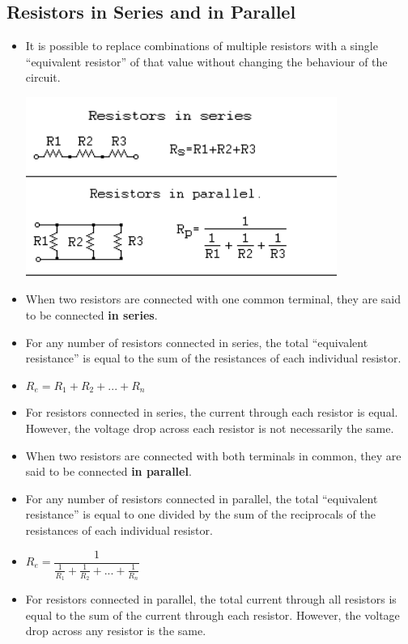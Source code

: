 \documentclass[letterpaper,12pt]{scrartcl}
\begin{document}
\subsection{Resistors in Series and in Parallel}

\begin{itemize}
\item It is possible to replace combinations of multiple resistors with a single ``equivalent resistor'' of that value
without changing the behaviour of the circuit.

\includegraphics[width=4.0in]{resistors-series-parallel.png}
\item When two resistors are connected with one common terminal, they are said to be connected \textbf{in series}.
\item For any number of resistors connected in series, the total ``equivalent resistance'' is equal to the sum of the resistances of each individual resistor.
\item $R_e = R_1 + R_2 + ... + R_n$
\item For resistors connected in series, the current through each resistor is equal. However, the voltage drop across each resistor
is not necessarily the same.
\item When two resistors are connected with both terminals in common, they are said to be connected \textbf{in parallel}.
\item For any number of resistors connected in parallel, the total ``equivalent resistance'' is equal to one divided by the sum of the reciprocals of the
resistances of each individual resistor.
\item $R_e = \dfrac{1}{\frac{1}{R_1} + \frac{1}{R_2} + ... + \frac{1}{R_n}}$
\item For resistors connected in parallel, the total current through all resistors is equal to the sum of the current through each resistor.
However, the voltage drop across any resistor is the same.
\end{itemize}
\end{document}
